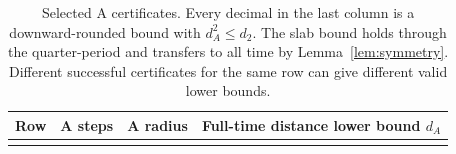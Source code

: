 \begin{longtable}{@{}rrrl@{}}
\toprule
Row & A steps & A radius & Full-time distance lower bound $d_A$\\
\midrule
\bottomrule
\caption{Selected A certificates. Every decimal in the last column
is a downward-rounded bound with $d_A^2\le d_2$. The slab bound holds
through the quarter-period and transfers to all time by
Lemma~\ref{lem:symmetry}. Different successful certificates for the
same row can give different valid lower bounds.}
\label{tab:distances}
\end{longtable}
